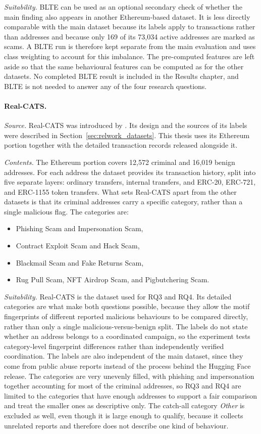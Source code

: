 \documentclass{thesisclass}
\begin{document}
\textit{Suitability.} BLTE can be used as an optional secondary check of whether
the main finding also appears in another Ethereum-based dataset. It is less
directly comparable with the main dataset because its labels apply to
transactions rather than addresses and because only 169 of its 73{,}034 active
addresses are marked as scams. A BLTE run is therefore kept separate from the
main evaluation and uses class weighting to account for this imbalance. The
pre-computed features are left aside so that the same behavioural features can
be computed as for the other datasets. No completed BLTE result is included in
the Results chapter, and BLTE is not needed to answer any of the four research
questions.

\paragraph{Real-CATS.}
\label{sec:dataset_realcats}
\textit{Source.} Real-CATS was introduced by \citet{shi2025realcats}. Its design
and the sources of its labels were described in
Section~\ref{sec:relwork_datasets}. This thesis uses its Ethereum portion
together with the detailed transaction records released alongside it.

\textit{Contents.} The Ethereum portion covers 12{,}572 criminal and 16{,}019
benign addresses. For each address the dataset provides its transaction history,
split into five separate layers: ordinary transfers, internal transfers, and
ERC-20, ERC-721, and ERC-1155 token transfers. What sets Real-CATS apart from
the other datasets is that its criminal addresses carry a specific category,
rather than a single malicious flag. The categories are:
\begin{itemize}
  \item Phishing Scam and Impersonation Scam,
  \item Contract Exploit Scam and Hack Scam,
  \item Blackmail Scam and Fake Returns Scam,
  \item Rug Pull Scam, NFT Airdrop Scam, and Pigbutchering Scam.
\end{itemize}

\textit{Suitability.} Real-CATS is the dataset used for RQ3 and RQ4. Its detailed
categories are what make both questions possible, because they allow the motif
fingerprints of different reported malicious behaviours to be compared directly,
rather than only a single malicious-versus-benign split. The labels do not state
whether an address belongs to a coordinated campaign, so the experiment tests
category-level fingerprint differences rather than independently verified
coordination. The labels are also
independent of the main dataset, since they come from public abuse reports
instead of the process behind the Hugging Face release. The categories are very
unevenly filled, with phishing and impersonation together accounting for most of
the criminal addresses, so RQ3 and RQ4 are limited to the categories that have
enough addresses to support a fair comparison and treat the smaller ones as
descriptive only. The catch-all category \emph{Other} is excluded as well, even
though it is large enough to qualify, because it collects unrelated reports and
therefore does not describe one kind of behaviour.
\end{document}
